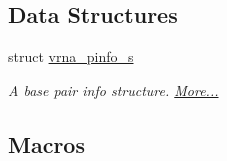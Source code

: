\subsection*{Data Structures}
\begin{DoxyCompactItemize}
\item 
struct \hyperlink{group__aln__utils_structvrna__pinfo__s}{vrna\+\_\+pinfo\+\_\+s}
\begin{DoxyCompactList}\small\item\em A base pair info structure.  \hyperlink{group__aln__utils_structvrna__pinfo__s}{More...}\end{DoxyCompactList}\end{DoxyCompactItemize}
\subsection*{Macros}
